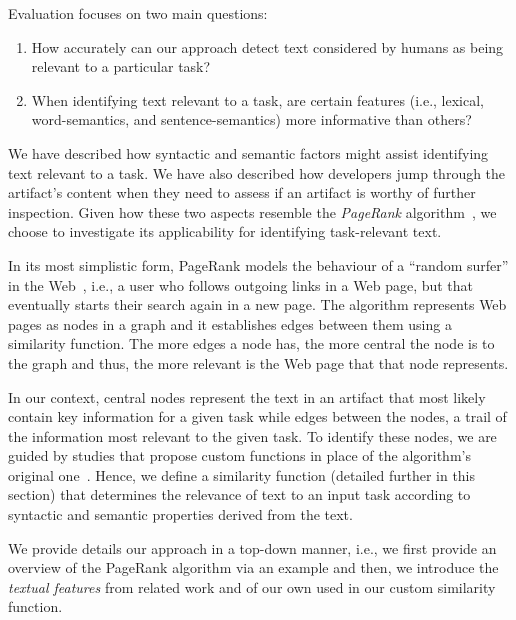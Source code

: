 Evaluation focuses on two main questions:

\begin{enumerate}
    \item How accurately can our approach detect text considered by humans as being relevant to a particular task?
    
    \item When identifying text relevant to a task, are certain features (i.e., lexical, word-semantics, and sentence-semantics) more informative than others?
\end{enumerate}



We have described how syntactic and semantic factors might assist 
identifying  text relevant to a task. %
We have also described how developers jump through the artifact's content when they  
need to assess if an artifact is worthy of further inspection. 
Given how these two aspects resemble the \textit{PageRank} algorithm~\cite{Page1999}, 
we choose to investigate its applicability for identifying task-relevant text.


In its most simplistic form, PageRank models the behaviour 
of a ``random surfer'' in the Web~\cite{Page1999}, i.e., 
a user who follows outgoing links in a Web page, but that 
eventually starts their search again in a new page. 
The algorithm represents Web pages as nodes in a graph and it
establishes edges between them using a similarity function.
The more edges a node has, the more central the node is to the graph
and thus, the more relevant is the Web page that that node represents.


In our context, central nodes represent the text in an artifact that most likely 
contain key information for a given task while edges between the nodes, a trail of the information most relevant to the given task.
To identify these nodes, we are guided by studies that 
propose custom functions in place of the algorithm's original one~\cite{Lotufo2012, Ponzanelli2017}. Hence, we define a similarity function (detailed further in this section)
that determines the relevance of text to an input task
according to syntactic and semantic properties derived from the text.


We provide details  our approach in a top-down manner, i.e., we first
provide an overview of the PageRank algorithm via an example and
then, we introduce the \textit{textual features} from related work and of our own used in our custom similarity function.


